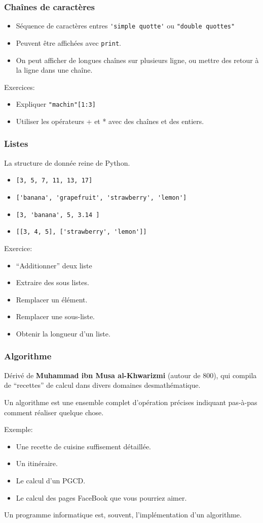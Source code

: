 \documentclass{beamer}
\begin{document}
\begin{frame}[fragile]\frametitle{Chaînes de caractères}
  \begin{itemize}
  \item Séquence de caractères entres {\verb|'simple quotte'|} ou {\verb|"double quottes"|}
  \item Peuvent être affichées avec {\verb|print|}.
  \item On peut afficher de longues chaînes sur plusieurs ligne, ou mettre des retour à la ligne dans une chaîne.
  \end{itemize}
  Exercices:
  \begin{itemize}
  \item Expliquer \verb|"machin"[1:3]|
  \item Utiliser les opérateurs + et * avec des chaînes et des entiers.
  \end{itemize}
\end{frame}

\begin{frame}[fragile]\frametitle{Listes}
  La structure de donnée reine de Python.
  \begin{itemize}
  \item \verb|[3, 5, 7, 11, 13, 17]|
  \item \verb|['banana', 'grapefruit', 'strawberry', 'lemon']|
  \item \verb|[3, 'banana', 5, 3.14 ]|
  \item \verb|[[3, 4, 5], ['strawberry', 'lemon']]|
  \end{itemize}
  Exercice:
  \begin{itemize}
  \item ``Additionner'' deux liste
  \item Extraire des sous listes.
  \item Remplacer un élément.
  \item Remplacer une sous-liste.
  \item Obtenir la longueur d'un liste.
  \end{itemize}
\end{frame}

\begin{frame}\frametitle{Algorithme}
  Dérivé de {\bf Muhammad ibn Musa al-Khwarizmi} (autour de 800), qui compila de ``recettes'' de calcul dans divers domaines desmathématique.

  Un algorithme est une ensemble complet d'opération précises indiquant pas-à-pas comment réaliser quelque chose.

  Exemple:
  \begin{itemize}
  \item Une recette de cuisine suffisement détaillée.
  \item Un itinéraire.
  \item Le calcul d'un PGCD.
  \item Le calcul des pages FaceBook que vous pourriez aimer.
  \end{itemize}
  
  Un programme informatique est, souvent, l'implémentation d'un algorithme.
\end{frame}
\end{document}
